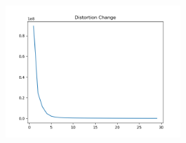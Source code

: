 \documentclass[12pt]{article}
\begin{document}
    \begin{figure}[H]
        \centering
        \includegraphics[width=0.60\textwidth]{Q5/distortion_large.png}
    \end{figure}
\end{document}
